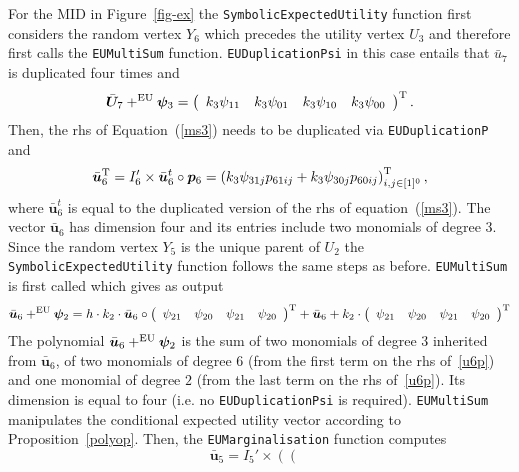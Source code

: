 \begin{example}
For the MID in Figure~\ref{fig-ex} the \texttt{SymbolicExpectedUtility} function first considers  the random vertex $Y_6$ which precedes the utility vertex $U_3$ and therefore first calls the \texttt{EUMultiSum} function. \texttt{EUDuplicationPsi} in this case entails that $\bar{u}_7$ is duplicated four times and 
\begin{equation}
\label{ms3}
\bar{\bm{U}}_7+^{\EU}\bm{\psi}_3=\left(
\begin{array}{cccc}
k_3\psi_{11}&
k_3\psi_{01}&
k_3\psi_{10}&
k_{3}\psi_{00}
\end{array}
\right)^\T.
\end{equation}
Then, the rhs of Equation~(\ref{ms3}) needs to be duplicated via \texttt{EUDuplicationP} and  
\begin{equation*}
\label{eq:ciao1}
\bar{\bm{u}}_6^\T=I'_6 \times \bar{\bm{u}}_6^t\circ \bm{p}_6= \left(k_3\psi_{31j}p_{61ij}+k_3\psi_{30j}p_{60ij}\right)_{i,j\in[1]^0}^\T,
\end{equation*}
where $\bar{\bm{u}}^t_6$ is equal to the duplicated version of the rhs of equation~(\ref{ms3}).
The vector $\bar{\bm{u}}_6$ has dimension four and its entries include two monomials of degree $3$. Since the random vertex $Y_5$ is the unique parent of $U_2$ the \texttt{SymbolicExpectedUtility} function follows the same steps as before. \texttt{EUMultiSum} is first called which gives as output
\begin{equation*}
\label{u6p}
\bar{\bm{u}}_6+^{\EU}\bm{\psi}_2= h\cdot k_2\cdot \bar{\bm{u}}_6\circ \left(
\begin{array}{cccc}
\psi_{21}&
\psi_{20}&
\psi_{21}&
\psi_{20}
\end{array}
\right)^\T+\bar{\bm{u}}_6+k_2\cdot\left(
\begin{array}{cccc}
\psi_{21}&
\psi_{20}&
\psi_{21}&
\psi_{20}
\end{array}
\right)^\T
\end{equation*}
The polynomial $\bar{\bm{u}}_6+^{\textnormal{EU}}\bm{\psi}_2$ is the sum of two monomials of degree $3$ inherited from $\bar{\bm{u}}_6$, of two monomials of degree $6$ (from the first term on the rhs of~\ref{u6p}) and one monomial of degree $2$ (from the last term on the rhs of~\ref{u6p}). Its dimension is equal to four (i.e. no \texttt{EUDuplicationPsi} is required). 
\texttt{EUMultiSum}  manipulates the conditional expected utility vector according to Proposition~\ref{polyop}. Then, the \texttt{EUMarginalisation} function computes
\[
\bar{\bm{u}}_5=
I_5'\times
\left(\left(\begin{array}{cc}

\end{array}\]
\end{example}
